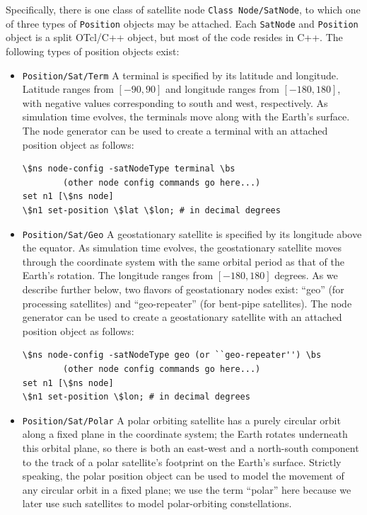 Specifically, there is one class of satellite node {\tt Class Node/SatNode},
to which one of three types of {\tt Position} objects may be attached.  
Each {\tt SatNode} and {\tt Position} object is a split OTcl/C++ object,
but most of the code resides in C++.  The following types of position objects 
exist: 
\begin{itemize}
\item {\tt Position/Sat/Term} A terminal is specified by its latitude and
longitude.  Latitude ranges from $[-90, 90]$ and longitude ranges from
$[-180, 180]$, with negative values corresponding to south and west, 
respectively.  As simulation time evolves, the terminals move along
with the Earth's surface.  The  node generator can be used 
to create a terminal with an attached position object as follows:
\begin{verbatim}
\$ns node-config -satNodeType terminal \bs
		(other node config commands go here...)
set n1 [\$ns node]
\$n1 set-position \$lat \$lon; # in decimal degrees
\end{verbatim}
\item {\tt Position/Sat/Geo} A geostationary satellite is specified by its 
longitude above the equator.  As simulation time evolves, the geostationary
satellite moves through the coordinate system with the same orbital period
as that of the Earth's rotation.  The longitude ranges from $[-180,180]$
degrees.  As we describe further below, two flavors of geostationary nodes
exist:  ``geo'' (for processing satellites) and ``geo-repeater'' (for bent-pipe
satellites).  The node generator can be
used to create a geostationary satellite with an attached position object as 
follows:
\begin{verbatim}
\$ns node-config -satNodeType geo (or ``geo-repeater'') \bs
		(other node config commands go here...)
set n1 [\$ns node]
\$n1 set-position \$lon; # in decimal degrees
\end{verbatim}
\item {\tt Position/Sat/Polar} A polar orbiting satellite has a purely
circular orbit along a fixed plane in the coordinate system; the Earth
rotates underneath this orbital plane, so there is both an east-west and
a north-south component to the track of a polar satellite's footprint on
the Earth's surface.  Strictly speaking, the polar position object can
be used to model the movement of any circular orbit in a fixed plane;  
we use the term ``polar'' here because we later use such satellites to model 
polar-orbiting constellations.


\end{itemize}
